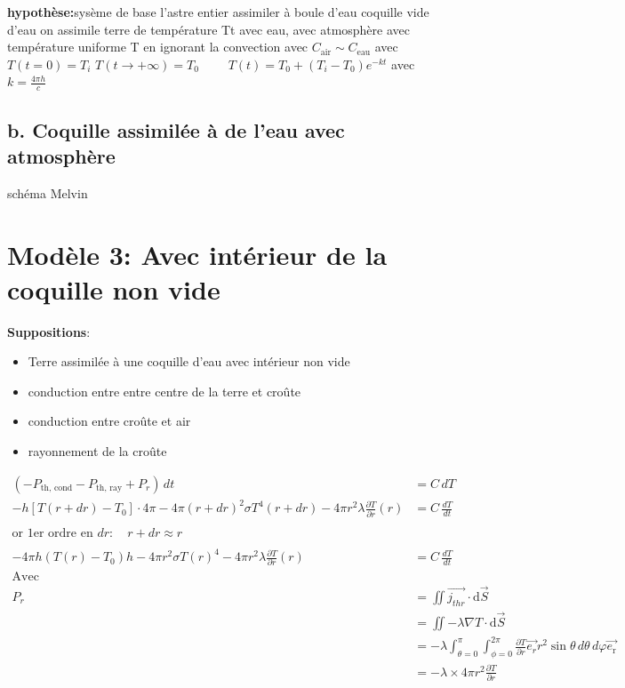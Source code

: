 \documentclass[a4paper,12pt]{article}
\begin{document}
\vspace{0.5cm}
\textbf{hypothèse:}sysème de base l'astre entier assimiler à boule d'eau 
coquille vide d'eau 
on assimile terre de température Tt avec eau, avec atmosphère avec température uniforme T  en ignorant la convection 
avec \(C_{\text{air}}\sim C_{\text{eau}}\)
avec  $T(t=0) = T_i$ 
$T(t \to +\infty) = T_0$  \ \ \ \
$T(t) = T_0 + (T_i - T_0)e^{-kt}$ \quad avec $k = \frac{4\pi h}{c}$
\subsection{b. Coquille assimilée à de l'eau avec atmosphère }
schéma Melvin

\section{Modèle 3: Avec intérieur de la coquille non vide }
\textbf{Suppositions}:
\begin{itemize}
    \item Terre assimilée à une coquille d'eau avec intérieur non vide 
    \item  conduction entre entre centre de la terre et croûte 
    \item  conduction entre croûte et air 
    \item  rayonnement de la croûte
    
    
    
\end{itemize}



\begin{align*}
(-P_{\text{th, cond}} - P_{\text{th, ray}} + P_r) \, dt &= C \, dT \\
-h\left[T(r + dr) - T_0\right] \cdot 4\pi - 4\pi  (r + dr)^2 \sigma T^4(r+dr) - 4\pi r^2 \lambda \frac{\partial T}{\partial r}(r) &= C \, \frac{dT}{dt} \\
\\
\text{or 1er ordre en } dr: \quad r + dr \approx r \\
\\
-4\pi h(T(r) - T_0)h-4\pi r^2 \sigma T(r)^4 - 4\pi r^2 \lambda \frac{\partial T}{\partial r}(r) &= C \, \frac{dT}{dt}
\\
\text{Avec }  
\\
P_{r} &= \iint \vec{j_{thr}} \cdot \mathrm{d}\vec{S} \\
&= \iint -\lambda \nabla T \cdot \mathrm{d}\vec{S} \\
&= -\lambda \int_{\theta=0}^\pi \int_{\phi=0}^{2\pi} \frac{\partial T}{\partial r} \vec{e_{r}}r^2\sin\theta\, d\theta\, d\varphi \vec{e_{\text{r}}}\\
&= -\lambda \times 4\pi r^2 \frac{\partial T}{\partial r}
\end{align*}

 
\vspace{1cm}
\end{document}

